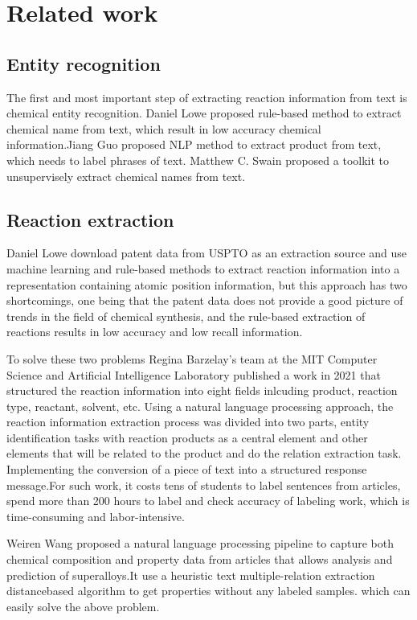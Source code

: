 \documentclass[%
 aip,
 jmp,%
 amsmath,amssymb,
 reprint,%
]{revtex4-2}
\begin{document}
\section{Related work}

\subsection{Entity recognition}
The first and most important step of extracting reaction information from text is chemical entity recognition.
Daniel Lowe proposed rule-based method to extract chemical name from text, which result in low accuracy chemical
information.Jiang Guo proposed NLP method to extract product from text, which needs to label phrases of text. 
Matthew C. Swain proposed a toolkit to unsupervisely extract chemical names from text.

\subsection{Reaction extraction}
Daniel Lowe download patent data from USPTO as an extraction source and use machine learning and rule-based 
methods to extract reaction information into a representation containing atomic position information, 
but this approach has two shortcomings, one being that the patent data does not provide a good picture 
of trends in the field of chemical synthesis, and the rule-based extraction of reactions results in 
low accuracy and low recall information.

To solve these two problems Regina Barzelay's team at the MIT Computer Science and Artificial Intelligence Laboratory published a work 
in 2021 that structured the reaction information into eight fields inlcuding product, reaction type, reactant, solvent, etc. Using a 
natural language processing approach, the reaction information extraction process was divided into two parts, entity identification tasks
with reaction products as a central element and other elements that will be related to the product and do the relation extraction task.
Implementing the conversion of a piece of text into a structured response message.For such work, it costs tens of students to label sentences
from articles, spend more than 200 hours to label and check accuracy of labeling work, which is time-consuming and labor-intensive.

Weiren Wang proposed a natural language processing pipeline to capture both chemical composition and property data from articles that allows analysis
and prediction of superalloys.It use a heuristic text multiple-relation extraction distancebased algorithm to get properties without any labeled samples.
which can easily solve the above problem.
\end{document}
